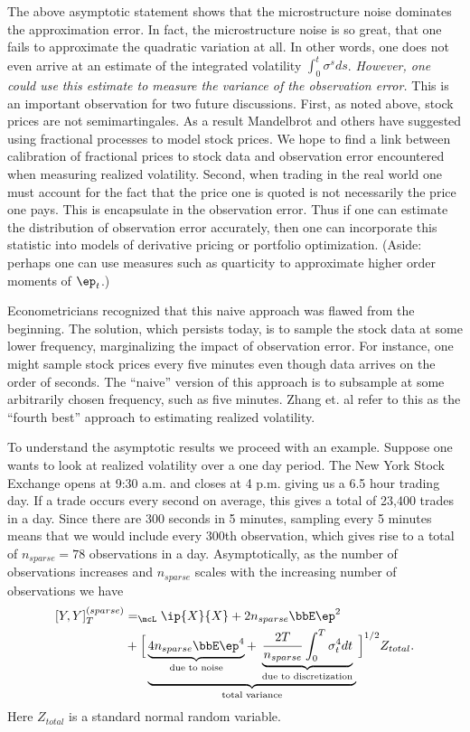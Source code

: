 \documentclass{report}
\begin{document}
The above asymptotic statement shows that the microstructure noise dominates the approximation error.  In fact, the microstructure noise is so great, that one fails to approximate the quadratic variation at all.  In other words, one does not even arrive at an estimate of the integrated volatility
$\int_0^t \sigma^s ds$.  \emph{However, one could use this estimate to
measure the variance of the observation error.}  This is an important
observation for two future discussions.  First, as noted above, stock
prices are not semimartingales.  As a result Mandelbrot and others
have suggested using fractional processes to model stock prices.  We
hope to find a link between calibration of fractional prices to stock
data and observation error encountered when measuring realized
volatility.  Second, when trading in the real world one must account
for the fact that the price one is quoted is not necessarily the price
one pays.  This is encapsulate in the observation error.  Thus if one
can estimate the distribution of observation error accurately, then
one can incorporate this statistic into models of derivative pricing
or portfolio optimization.  (Aside: perhaps one can use measures such
as quarticity to approximate higher order moments of $\ep_t$.)

Econometricians recognized that this naive approach was flawed from
the beginning.  The solution, which persists today, is to sample the
stock data at some lower frequency, marginalizing the impact of
observation error.  For instance, one might sample stock prices every
five minutes even though data arrives on the order of seconds.  The
``naive'' version of this approach is to subsample at some arbitrarily
chosen frequency, such as five minutes.  Zhang et. al refer to this as
the ``fourth best'' approach to estimating realized volatility.

To understand the asymptotic results we proceed with an example. 
Suppose one wants to look at realized volatility over a one day
period.  The New York Stock Exchange opens at 9:30 a.m. and closes at
4 p.m. giving us a 6.5 hour trading day.  If a trade occurs every
second on average, this gives a total of 23,400 trades in a day. 
Since there are 300 seconds in 5 minutes, sampling every 5 minutes
means that we would include every 300th observation, which gives rise
to a total of $n_{sparse} = 78$ observations in a day. 
Asymptotically, as the number of observations increases and
$n_{sparse}$ scales with the increasing number of observations we have
\begin{displaymath}
\begin{split}
[Y,Y]_T^{(sparse)} & =_{\mcL} \ip{X}{X} + 2 n_{sparse} \bbE \ep^2 \\
& + 
\Big[ 
\underbrace{
  \underbrace{4 n_{sparse} \bbE \ep^4}_{\textmd{ due to noise }} 
  + 
  \underbrace{\frac{2T}{n_{sparse}}  
    \int_0^T \sigma_t^4 dt}_{\textmd{ due to discretization }}
}_{\textmd{ total variance }}
\Big]^{1/2} Z_{total}.
\end{split}
\end{displaymath}
Here $Z_{total}$ is a standard normal random variable.
\end{document}
